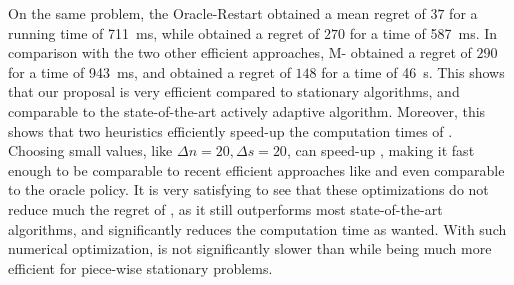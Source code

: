 On the same problem,
the Oracle-Restart \klUCB{} obtained a mean regret of $37$ for a running time of \SI{711}{\milli\second},
while \klUCB{} obtained a regret of $270$ for a time of \SI{587}{\milli\second}.
In comparison with the two other efficient approaches, M-\klUCB{} obtained a regret of $290$ for a time of \SI{943}{\milli\second},
and \CUSUMklUCB{} obtained a regret of $148$ for a time of \SI{46}{\second}.
%
This shows that our proposal is very efficient compared to stationary algorithms, and comparable to the state-of-the-art actively adaptive algorithm.
Moreover, this shows that two heuristics efficiently speed-up the computation times of \GLRklUCB.
Choosing small values, like $\Delta n = 20, \Delta s = 20$, can speed-up \GLRklUCB, making it fast enough to be comparable to recent efficient approaches like \MUCB{} and even comparable to the oracle policy.
%
It is very satisfying to see that these optimizations do not reduce much the regret of \GLRklUCB, as it still outperforms most state-of-the-art algorithms, and significantly reduces the computation time as wanted.
With such numerical optimization, \GLRklUCB{} is not significantly slower than \klUCB{} while being much more efficient for piece-wise stationary problems.



